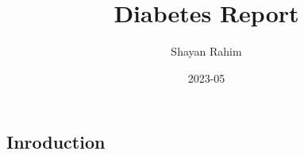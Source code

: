 \documentclass[
]{article}
\title{Diabetes Report}
\author{Shayan Rahim}
\date{2023-05}
\begin{document}
\maketitle

\hypertarget{inroduction}{%
\subsection{Inroduction}\label{inroduction}}

\hypertarget{according-to-the-cdc-diabetes-is-one-of-the-most-common-chronic-diseases-that-people-have.-in-this-report-im-going-to-analyze-a-dataset-from-kaggle-which-was-orginally-from-the-national-institute-of-diabetes-and-digestive-and-kidney-diseases-in-maryland.-the-dataset-contains-data-fo-people-for-who-are-diabetic-and-who-arent.-the-dataset-contains-data-for-cholesterol-levels-systolic-and-diastolic-blood-pressure-glucose-levels-and-bmi-which-made-me-interested-in-the-dataset.-to-analyze-the-data-im-going-to-answer-the-question-what-facors-inncrease-the-likelihood-of-having-diabetes-by-anaylyzing-correlations-between-the-vitals-that-are-provided-in-the-dataset-and-diabeticenon-diabetic-persons.}{%
}
\end{document}
